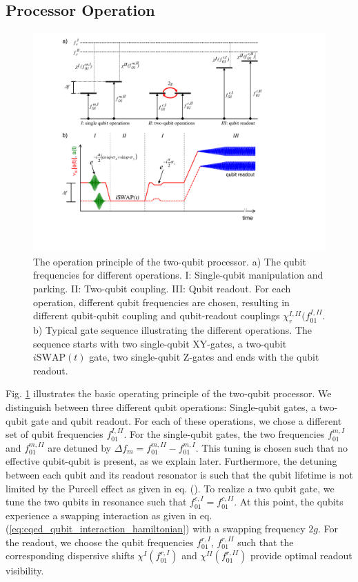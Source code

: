 \subsection{Processor Operation}

\begin{figure}[ht!]
	\centering
	\includegraphics[width=\textwidth]{./material/figures/2-qubit-processor/processor_working_principle}
	\caption[...]{The operation principle of the two-qubit processor. a) The qubit frequencies for different operations. I: Single-qubit manipulation and parking. II: Two-qubit coupling. III: Qubit readout. For each operation, different qubit frequencies are chosen, resulting in different qubit-qubit coupling and qubit-readout couplings $\chi_r^{I,II}(f_{01}^{I,II}$. b) Typical gate sequence illustrating the different operations. The sequence starts with two single-qubit XY-gates, a two-qubit $i\mathrm{SWAP}(t)$ gate, two single-qubit Z-gates and ends with the qubit readout.}
	\label{fig:processor_operation}
\end{figure}

Fig. \ref{fig:processor_operation} illustrates the basic operating principle of the two-qubit processor. We distinguish between three different qubit operations: Single-qubit gates, a two-qubit gate and qubit readout. For each of these operations, we chose a different set of qubit frequencies $f_{01}^{I,II}$. For the single-qubit gates, the two frequencies $f_{01}^{m,I}$ and $f_{01}^{m,II}$ are detuned by $\Delta f_m = f_{01}^{m,II}-f_{01}^{m,I}$. This tuning is chosen such that no effective qubit-qubit is present, as we explain later. Furthermore, the detuning between each qubit and its readout resonator is such that the qubit lifetime is not limited by the Purcell effect as given in eq. (). To realize a two qubit gate, we tune the two qubits in resonance such that $f_{01}^{c,I} = f_{01}^{c,II}$. At this point, the qubits experience a swapping interaction as given in eq. (\ref{eq:cqed_qubit_interaction_hamiltonian}) with a swapping frequency $2g$. For the readout, we choose the qubit frequencies $f_{01}^{r,I}$, $f_{01}^{r,II}$ such that the corresponding dispersive shifts $\chi^I(f_{01}^{r,I})$ and $\chi^{II}(f_{01}^{r,II})$ provide optimal readout visibility.

